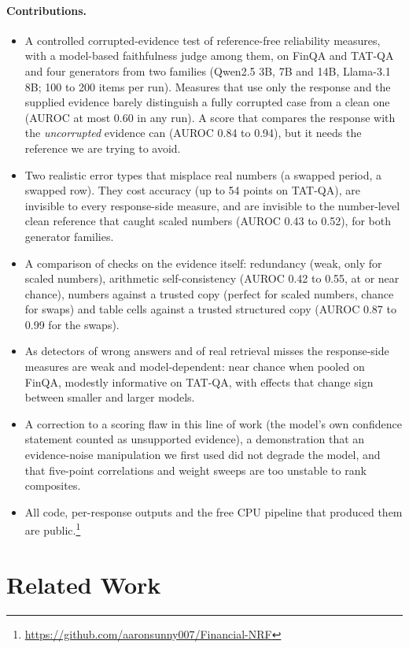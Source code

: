\paragraph{Contributions.}
\begin{itemize}[leftmargin=*,itemsep=2pt,topsep=2pt]
\item A controlled corrupted-evidence test of reference-free reliability measures, with a model-based faithfulness judge among them, on FinQA and TAT-QA and four generators from two families (Qwen2.5 3B, 7B and 14B, Llama-3.1 8B; 100 to 200 items per run). Measures that use only the response and the supplied evidence barely distinguish a fully corrupted case from a clean one (AUROC at most 0.60 in any run). A score that compares the response with the \emph{uncorrupted} evidence can (AUROC 0.84 to 0.94), but it needs the reference we are trying to avoid.
\item Two realistic error types that misplace real numbers (a swapped period, a swapped row). They cost accuracy (up to 54 points on TAT-QA), are invisible to every response-side measure, and are invisible to the number-level clean reference that caught scaled numbers (AUROC 0.43 to 0.52), for both generator families.
\item A comparison of checks on the evidence itself: redundancy (weak, only for scaled numbers), arithmetic self-consistency (AUROC 0.42 to 0.55, at or near chance), numbers against a trusted copy (perfect for scaled numbers, chance for swaps) and table cells against a trusted structured copy (AUROC 0.87 to 0.99 for the swaps).
\item As detectors of wrong answers and of real retrieval misses the response-side measures are weak and model-dependent: near chance when pooled on FinQA, modestly informative on TAT-QA, with effects that change sign between smaller and larger models.
\item A correction to a scoring flaw in this line of work (the model's own confidence statement counted as unsupported evidence), a demonstration that an evidence-noise manipulation we first used did not degrade the model, and that five-point correlations and weight sweeps are too unstable to rank composites.
\item All code, per-response outputs and the free CPU pipeline that produced them are public.\footnote{\url{https://github.com/aaronsunny007/Financial-NRF}}
\end{itemize}

\section{Related Work}

